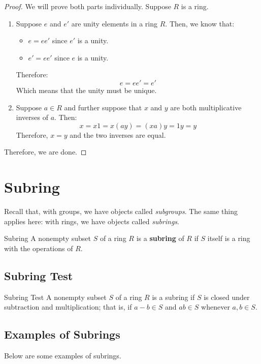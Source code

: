 \documentclass[letterpaper]{article}
\begin{document}
\begin{mdframed}[]
    \begin{proof}
        We will prove both parts individually. Suppose $R$ is a ring.  
        \begin{enumerate}
            \item Suppose $e$ and $e'$ are unity elements in a ring $R$. Then, we know that: 
            \begin{itemize}
                \item $e = ee'$ since $e'$ is a unity. 
                \item $e' = ee'$ since $e$ is a unity. 
            \end{itemize}
            Therefore: 
            \[e = ee' = e'\]
            Which means that the unity must be unique. 

            \item Suppose $a \in R$ and further suppose that $x$ and $y$ are both multiplicative inverses of $a$. Then: 
            \[x = x1 = x(ay) = (xa)y = 1y = y\]
            Therefore, $x = y$ and the two inverses are equal. 
        \end{enumerate}
        Therefore, we are done. 
    \end{proof}
\end{mdframed}


\newpage 
\section{Subring}
Recall that, with groups, we have objects called \emph{subgroups}. The same thing applies here: with rings, we have objects called \emph{subrings}.
\begin{definition}{Subring}{}
    A nonempty subset $S$ of a ring $R$ is a \textbf{subring} of $R$ if $S$ itself is a ring with the operations of $R$.
\end{definition}

\subsection{Subring Test}
\begin{theorem}{Subring Test}{}
    A nonempty subset $S$ of a ring $R$ is a subring if $S$ is closed under subtraction and multiplication; that is, if $a - b \in S$ and $ab \in S$ whenever $a, b \in S$. 
\end{theorem}

\subsection{Examples of Subrings}
Below are some examples of subrings. 
\end{document}
